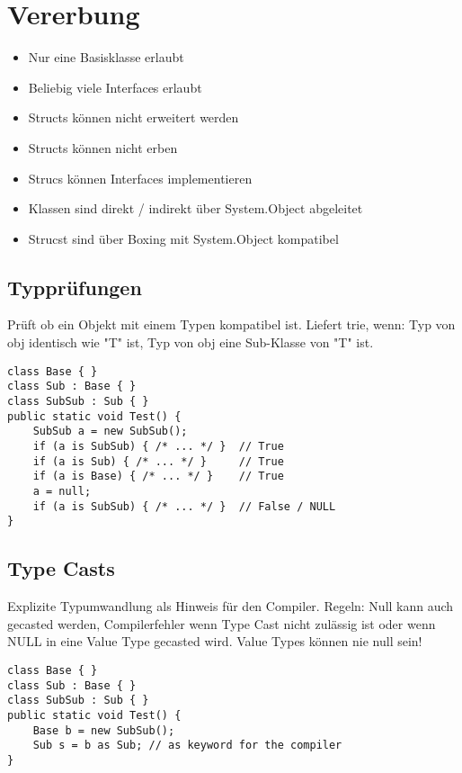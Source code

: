 \section{Vererbung}
\begin{itemize}
  \itemsep -0.5em 
  \item Nur eine Basisklasse erlaubt
  \item Beliebig viele Interfaces erlaubt
  \item Structs können nicht erweitert werden
  \item Structs können nicht erben
  \item Strucs können Interfaces implementieren
  \item Klassen sind direkt / indirekt über System.Object abgeleitet
  \item Strucst sind über Boxing mit System.Object kompatibel
\end{itemize}

\subsection{Typprüfungen}
Prüft ob ein Objekt mit einem Typen kompatibel ist. Liefert trie, wenn: Typ von obj identisch wie "T" ist, Typ von obj eine Sub-Klasse von "T" ist.
\begin{lstlisting}
class Base { } 
class Sub : Base { } 
class SubSub : Sub { } 
public static void Test() {
	SubSub a = new SubSub();
	if (a is SubSub) { /* ... */ } 	// True 
	if (a is Sub) { /* ... */ } 	// True 
	if (a is Base) { /* ... */ } 	// True 
	a = null;
	if (a is SubSub) { /* ... */ } 	// False / NULL	
}
\end{lstlisting}

\subsection{Type Casts}
Explizite Typumwandlung als Hinweis für den Compiler. Regeln: Null kann auch gecasted werden, Compilerfehler wenn Type Cast nicht zulässig ist oder wenn NULL in eine Value Type gecasted wird. Value Types können nie null sein!
\begin{lstlisting}
class Base { } 
class Sub : Base { } 
class SubSub : Sub { } 
public static void Test() {
	Base b = new SubSub();
	Sub s = b as Sub; // as keyword for the compiler
}
\end{lstlisting}

